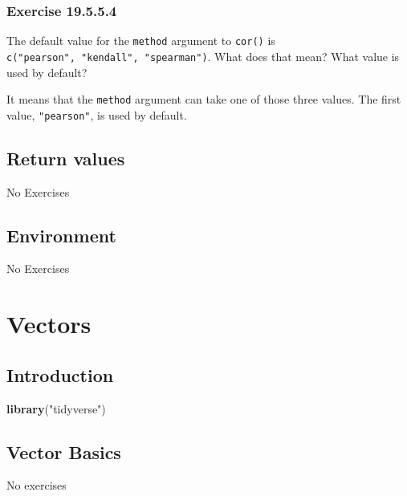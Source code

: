 \documentclass[]{book}
\newenvironment{Shaded}{\begin{snugshade}}{\end{snugshade}}
\newcommand{\KeywordTok}[1]{\textcolor[rgb]{0.13,0.29,0.53}{\textbf{#1}}}
\newcommand{\NormalTok}[1]{#1}
\newcommand{\StringTok}[1]{\textcolor[rgb]{0.31,0.60,0.02}{#1}}
\theoremstyle{plain}
\theoremstyle{remark}
\begin{document}
\hypertarget{exercise-19.5.5.4}{%
\subsection*{\texorpdfstring{Exercise {19.5.5.4}}{Exercise 19.5.5.4}}\label{exercise-19.5.5.4}}

The default value for the \texttt{method} argument to \texttt{cor()} is \texttt{c("pearson",\ "kendall",\ "spearman")}.
What does that mean? What value is used by default?

It means that the \texttt{method} argument can take one of those three values.
The first value, \texttt{"pearson"}, is used by default.

\hypertarget{return-values}{%
\section{Return values}\label{return-values}}

No Exercises

\hypertarget{environment}{%
\section{Environment}\label{environment}}

No Exercises

\hypertarget{vectors}{%
\chapter{Vectors}\label{vectors}}

\hypertarget{introduction-13}{%
\section{Introduction}\label{introduction-13}}

\begin{Shaded}
\begin{Highlighting}[]
\KeywordTok{library}\NormalTok{(}\StringTok{"tidyverse"}\NormalTok{)}
\end{Highlighting}
\end{Shaded}

\hypertarget{vector-basics}{%
\section{Vector Basics}\label{vector-basics}}

No exercises
\end{document}
